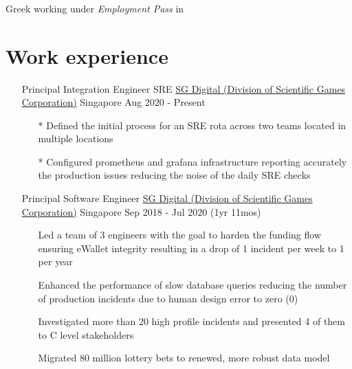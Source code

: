 \documentclass{CVSoftwareEngineer}
\begin{document}
	\section{\textbf{\cvname}}
	\begin{center}
		\href{mailto:\cvmail}{\cvmail} \space \textbar \space \cvlinkedin \space \textbar \space \cvgithub \\
		Greek working under \textit{Employment Pass} in \cvaddress
	\end{center}

	\section{Work experience}
	\begin{enumerate}[labelwidth=!, labelindent=0pt, leftmargin=*, rightmargin=15pt]
		\item[] \cvExperience
			{Principal Integration Engineer \textbar SRE}
			{\href{https://www.sgdigital.com/}{SG Digital (Division of Scientific Games Corporation)}}
			{Singapore}
			{Aug 2020 - Present}
			{\begin{enumerate}[labelwidth=!, labelindent=0pt, nosep, leftmargin=*]
					\item[*] Defined the initial process for an SRE rota across two teams located in multiple locations
					\item[*] Configured prometheus and grafana infrastructure reporting accurately the production issues reducing the noise of the daily SRE checks
				\end{enumerate}
			}

		\item[] \cvExperience
			{Principal Software Engineer}
			{\href{https://www.sgdigital.com/}{SG Digital (Division of Scientific Games Corporation)}}
			{Singapore}
			{Sep 2018 - Jul 2020 (1yr 11mos)}
			{\begin{enumerate}[labelwidth=!, labelindent=0pt, nosep, leftmargin=*]
					\item[\textasteriskcentered] Led a team of 3 engineers with the goal to harden the
						funding flow ensuring eWallet integrity resulting in a drop of 1 incident per week
						to 1 per year
					\item[\textasteriskcentered] Enhanced the performance of slow database queries reducing
						the number of production incidents due to human design error to zero (0)
					\item[\textasteriskcentered] Investigated more than 20 high profile incidents and
						presented 4 of them to C level stakeholders
					\item[\textasteriskcentered] Migrated 80 million lottery bets to renewed,
						more robust data model
				\end{enumerate}
			}


\end{enumerate}
\end{document}
